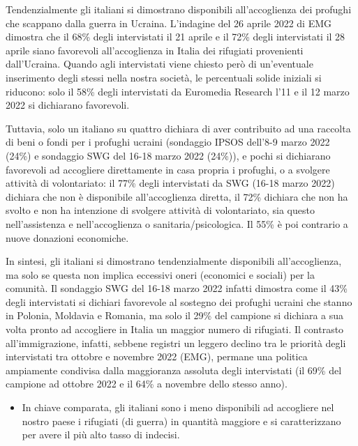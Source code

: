 \documentclass[
  openany]{book}
\providecommand{\tightlist}{%
  \setlength{\itemsep}{0pt}\setlength{\parskip}{0pt}}
\begin{document}
Tendenzialmente gli italiani si dimostrano disponibili all'accoglienza dei profughi che scappano dalla guerra in Ucraina. L'indagine del 26 aprile 2022 di EMG dimostra che il 68\% degli intervistati il 21 aprile e il 72\% degli intervistati il 28 aprile siano favorevoli all'accoglienza in Italia dei rifugiati provenienti dall'Ucraina. Quando agli intervistati viene chiesto però di un'eventuale inserimento degli stessi nella nostra società, le percentuali solide iniziali si riducono: solo il 58\% degli intervistati da Euromedia Research l'11 e il 12 marzo 2022 si dichiarano favorevoli.

Tuttavia, solo un italiano su quattro dichiara di aver contribuito ad una raccolta di beni o fondi per i profughi ucraini (sondaggio IPSOS dell'8-9 marzo 2022 (24\%) e sondaggio SWG del 16-18 marzo 2022 (24\%)), e pochi si dichiarano favorevoli ad accogliere direttamente in casa propria i profughi, o a svolgere attività di volontariato: il 77\% degli intervistati da SWG (16-18 marzo 2022) dichiara che non è disponibile all'accoglienza diretta, il 72\% dichiara che non ha svolto e non ha intenzione di svolgere attività di volontariato, sia questo nell'assistenza e nell'accoglienza o sanitaria/psicologica. Il 55\% è poi contrario a nuove donazioni economiche.

In sintesi, gli italiani si dimostrano tendenzialmente disponibili all'accoglienza, ma solo se questa non implica eccessivi oneri (economici e sociali) per la comunità. Il sondaggio SWG del 16-18 marzo 2022 infatti dimostra come il 43\% degli intervistati si dichiari favorevole al sostegno dei profughi ucraini che stanno in Polonia, Moldavia e Romania, ma solo il 29\% del campione si dichiara a sua volta pronto ad accogliere in Italia un maggior numero di rifugiati. Il contrasto all'immigrazione, infatti, sebbene registri un leggero declino tra le priorità degli intervistati tra ottobre e novembre 2022 (EMG), permane una politica ampiamente condivisa dalla maggioranza assoluta degli intervistati (il 69\% del campione ad ottobre 2022 e il 64\% a novembre dello stesso anno).

\begin{itemize}
\tightlist
\item
  In chiave comparata, gli italiani sono i meno disponibili ad accogliere nel nostro paese i rifugiati (di guerra) in quantità maggiore e si caratterizzano per avere il più alto tasso di indecisi.
\end{itemize}
\end{document}
